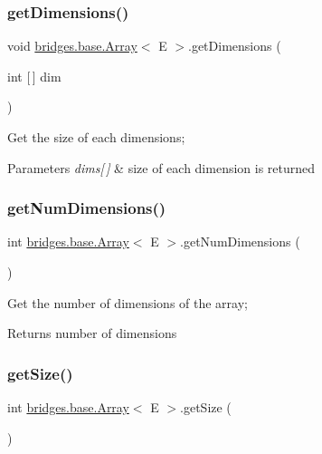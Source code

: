 \subsubsection{\texorpdfstring{get\+Dimensions()}{getDimensions()}}
{\footnotesize\ttfamily void \hyperlink{classbridges_1_1base_1_1_array}{bridges.\+base.\+Array}$<$ E $>$.get\+Dimensions (\begin{DoxyParamCaption}\item[{int \mbox{[}$\,$\mbox{]}}]{dim }\end{DoxyParamCaption})}

Get the size of each dimensions;


\begin{DoxyParams}{Parameters}
{\em dims\mbox{[}$\,$\mbox{]}} & size of each dimension is returned \\
\hline
\end{DoxyParams}
\hypertarget{classbridges_1_1base_1_1_array_a808da9a62df3f0e7a905ec895a82087a}{}\label{classbridges_1_1base_1_1_array_a808da9a62df3f0e7a905ec895a82087a} 
\subsubsection{\texorpdfstring{get\+Num\+Dimensions()}{getNumDimensions()}}
{\footnotesize\ttfamily int \hyperlink{classbridges_1_1base_1_1_array}{bridges.\+base.\+Array}$<$ E $>$.get\+Num\+Dimensions (\begin{DoxyParamCaption}{ }\end{DoxyParamCaption})}

Get the number of dimensions of the array;

\begin{DoxyReturn}{Returns}
number of dimensions 
\end{DoxyReturn}
\hypertarget{classbridges_1_1base_1_1_array_a49a3a4ea72c8315f1f14eed25071d18a}{}\label{classbridges_1_1base_1_1_array_a49a3a4ea72c8315f1f14eed25071d18a} 
\subsubsection{\texorpdfstring{get\+Size()}{getSize()}}
{\footnotesize\ttfamily int \hyperlink{classbridges_1_1base_1_1_array}{bridges.\+base.\+Array}$<$ E $>$.get\+Size (\begin{DoxyParamCaption}{ }\end{DoxyParamCaption})}

